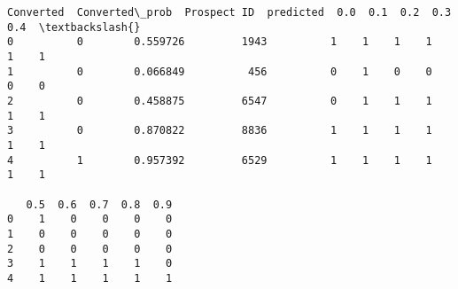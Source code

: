 \documentclass[11pt]{article}
\makeatletter
\newcommand{\boxspacing}{\kern\kvtcb@left@rule\kern\kvtcb@boxsep}
\newcommand{\prompt}[4]{
        \ttfamily\llap{{\color{#2}[#3]:\hspace{3pt}#4}}\vspace{-\baselineskip}
    }
\makeatother
\begin{document}
            \begin{tcolorbox}[breakable, size=fbox, boxrule=.5pt, pad at break*=1mm, opacityfill=0]
\prompt{Out}{outcolor}{98}{\boxspacing}
\begin{Verbatim}[commandchars=\\\{\}]
   Converted  Converted\_prob  Prospect ID  predicted  0.0  0.1  0.2  0.3  0.4  \textbackslash{}
0          0        0.559726         1943          1    1    1    1    1    1
1          0        0.066849          456          0    1    0    0    0    0
2          0        0.458875         6547          0    1    1    1    1    1
3          0        0.870822         8836          1    1    1    1    1    1
4          1        0.957392         6529          1    1    1    1    1    1

   0.5  0.6  0.7  0.8  0.9
0    1    0    0    0    0
1    0    0    0    0    0
2    0    0    0    0    0
3    1    1    1    1    0
4    1    1    1    1    1
\end{Verbatim}
\end{tcolorbox}
        
\end{document}

